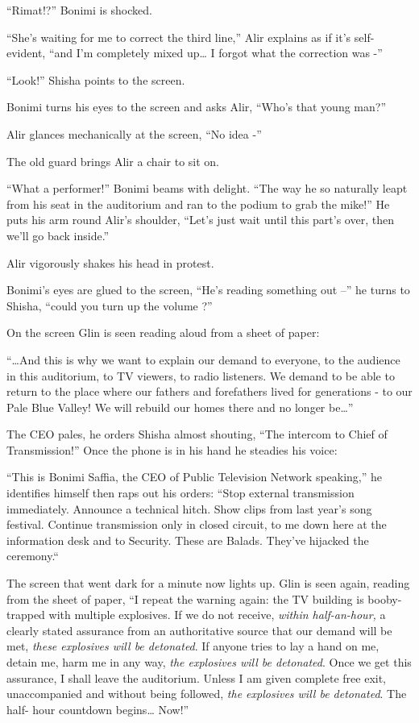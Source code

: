 \documentclass[twoside,11pt]{book}
\begin{document}
``Rimat!?'' Bonimi is shocked.

``She's waiting for me to correct the third line,'' Alir explains as if it's self-evident,
``and I'm completely mixed up{\ldots} I forgot what the correction was -''

``Look!'' Shisha points to the screen.

Bonimi turns his eyes to the screen and asks Alir, ``Who's that young man?''

Alir glances mechanically at the screen, ``No idea -''

The old guard brings Alir a chair to sit on.

``What a performer!'' Bonimi beams with delight. ``The way he so naturally leapt
from his seat in the auditorium and ran to the podium to grab the mike!'' He puts his arm round Alir's
shoulder, ``Let's just wait until this part's over, then we'll go back inside.''

Alir vigorously shakes his head in protest.

Bonimi's eyes are glued to the screen, ``He's reading something out --'' he turns to Shisha,
``could you turn up the volume ?''

On the screen Glin is seen reading aloud from a sheet of paper:

``{\dots}And this is why we want to explain our demand to everyone, to the audience in this auditorium,
to TV viewers, to radio listeners. We demand to be able to return to the place where our fathers and forefathers lived
for generations - to our Pale Blue Valley! We will rebuild our homes there and no longer be{\dots}''

The CEO pales, he orders Shisha almost shouting, ``The intercom to Chief of Transmission!''
Once the phone is in his hand he steadies his voice:

``This is Bonimi Saffia, the CEO of Public Television Network speaking,'' he identifies
himself then raps out his orders: ``Stop external transmission immediately. Announce a technical hitch.
Show clips from last year's song festival. Continue transmission only in closed circuit, to me down here at the
information desk and to Security. These are Balads. They've hijacked the ceremony.``

The screen that went dark for a minute now lights up. Glin is seen again, reading from the sheet of paper,
``I repeat the warning again: the TV building is booby-trapped with multiple explosives. If we do not
receive, \textit{within half-an-hour,} a clearly stated assurance from an authoritative source that our demand will be
met, \textit{these explosives will be detonated}. If anyone tries to lay a hand on me, detain me, harm me in any way,
\textit{the explosives will be detonated}. Once we get this assurance, I shall leave the auditorium. Unless I am given
complete free exit, unaccompanied and without{ }being followed, \textit{the
explosives will be detonated}. The half- hour countdown begins{\dots} Now!''
\end{document}

